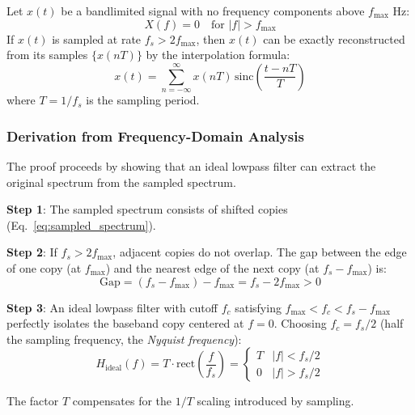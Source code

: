 \begin{theorem}
\label{thm:nyquist_shannon}
Let $x(t)$ be a bandlimited signal with no frequency components above $f_{\max}$ Hz:
\begin{equation}
X(f) = 0 \quad \text{for } |f| > f_{\max}
\label{eq:bandlimited}
\end{equation}
If $x(t)$ is sampled at rate $f_s > 2f_{\max}$, then $x(t)$ can be exactly reconstructed from its samples $\{x(nT)\}$ by the interpolation formula:
\begin{equation}
x(t) = \sum_{n=-\infty}^{\infty} x(nT) \, \mathrm{sinc}\left(\frac{t - nT}{T}\right)
\label{eq:sinc_interpolation}
\end{equation}
where $T = 1/f_s$ is the sampling period.
\end{theorem}

\subsubsection{Derivation from Frequency-Domain Analysis}

The proof proceeds by showing that an ideal lowpass filter can extract the original spectrum from the sampled spectrum.

\textbf{Step 1}: The sampled spectrum consists of shifted copies (Eq.~\ref{eq:sampled_spectrum}).

\textbf{Step 2}: If $f_s > 2f_{\max}$, adjacent copies do not overlap. The gap between the edge of one copy (at $f_{\max}$) and the nearest edge of the next copy (at $f_s - f_{\max}$) is:
\begin{equation}
\text{Gap} = (f_s - f_{\max}) - f_{\max} = f_s - 2f_{\max} > 0
\label{eq:gap}
\end{equation}

\textbf{Step 3}: An ideal lowpass filter with cutoff $f_c$ satisfying $f_{\max} < f_c < f_s - f_{\max}$ perfectly isolates the baseband copy centered at $f = 0$. Choosing $f_c = f_s/2$ (half the sampling frequency, the \textit{Nyquist frequency}):
\begin{equation}
H_{\text{ideal}}(f) = T \cdot \mathrm{rect}\left(\frac{f}{f_s}\right) =
\begin{cases}
T & |f| < f_s/2 \\
0 & |f| > f_s/2
\end{cases}
\label{eq:ideal_lpf}
\end{equation}

The factor $T$ compensates for the $1/T$ scaling introduced by sampling.

